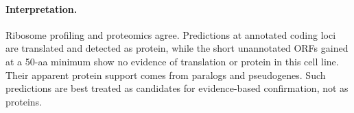 \paragraph{Interpretation.}
Ribosome profiling and proteomics agree. Predictions at annotated coding loci are translated and
detected as protein, while the short unannotated ORFs gained at a 50-aa minimum show no evidence of
translation or protein in this cell line. Their apparent protein support comes from paralogs and
pseudogenes. Such predictions are best treated as candidates for evidence-based confirmation, not
as proteins.
